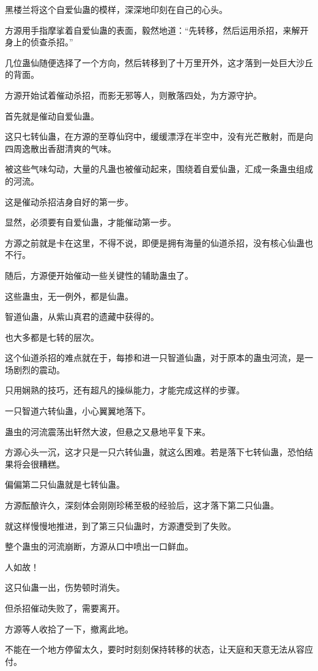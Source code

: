 \begin{this_body}
黑楼兰将这个自爱仙蛊的模样，深深地印刻在自己的心头。

方源用手指摩挲着自爱仙蛊的表面，毅然地道：“先转移，然后运用杀招，来解开身上的侦查杀招。”

几位蛊仙随便选择了一个方向，然后转移到了十万里开外，这才落到一处巨大沙丘的背面。

方源开始试着催动杀招，而影无邪等人，则散落四处，为方源守护。

首先就是催动自爱仙蛊。

这只七转仙蛊，在方源的至尊仙窍中，缓缓漂浮在半空中，没有光芒散射，而是向四周逸散出香甜清爽的气味。

被这些气味勾动，大量的凡蛊也被催动起来，围绕着自爱仙蛊，汇成一条蛊虫组成的河流。

这是催动杀招洁身自好的第一步。

显然，必须要有自爱仙蛊，才能催动第一步。

方源之前就是卡在这里，不得不说，即便是拥有海量的仙道杀招，没有核心仙蛊也不行。

随后，方源便开始催动一些关键性的辅助蛊虫了。

这些蛊虫，无一例外，都是仙蛊。

智道仙蛊，从紫山真君的遗藏中获得的。

也大多都是七转的层次。

这个仙道杀招的难点就在于，每掺和进一只智道仙蛊，对于原本的蛊虫河流，是一场剧烈的震动。

只用娴熟的技巧，还有超凡的操纵能力，才能完成这样的步骤。

一只智道六转仙蛊，小心翼翼地落下。

蛊虫的河流震荡出轩然大波，但悬之又悬地平复下来。

方源心头一沉，这才只是一只六转仙蛊，就这么困难。若是落下七转仙蛊，恐怕结果将会很糟糕。

偏偏第二只仙蛊就是七转仙蛊。

方源酝酿许久，深刻体会刚刚珍稀至极的经验后，这才落下第二只仙蛊。

就这样慢慢地推进，到了第三只仙蛊时，方源遭受到了失败。

整个蛊虫的河流崩断，方源从口中喷出一口鲜血。

人如故！

这只仙蛊一出，伤势顿时消失。

但杀招催动失败了，需要离开。

方源等人收拾了一下，撤离此地。

不能在一个地方停留太久，要时时刻刻保持转移的状态，让天庭和天意无法从容应付。


\end{this_body}
